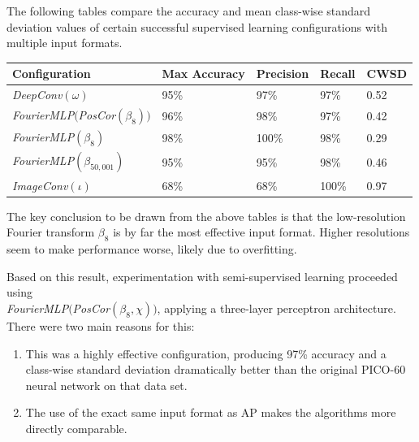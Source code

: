 \documentclass[10pt]{article}
\begin{document}
The following tables compare the accuracy and mean class-wise standard deviation values of certain successful supervised learning configurations with multiple input formats.

\begin{minipage}{\textwidth}
    \begin{center}
        \begin{tabular}{|l|l|l|l|l|}
            \hline
            Configuration & Max Accuracy & Precision & Recall & CWSD \\
            \hline
            {\it DeepConv}$(\omega)$ & 95\% & 97\% & 97\% & 0.52 \\
            \hline
            {\it FourierMLP}$(${\it PosCor}$(\beta_{8}))$ & 96\% & 98\% & 97\% & 0.42 \\
            \hline
            {\it FourierMLP}$(\beta_{8})$ & 98\% & 100\% & 98\% & 0.29 \\
            \hline
            {\it FourierMLP}$(\beta_{50,001})$ & 95\% & 95\% & 98\% & 0.46 \\
            \hline
            {\it ImageConv}$(\iota)$ & 68\% & 68\% & 100\% & 0.97 \\
            \hline
        \end{tabular}
    \end{center}
\end{minipage}

The key conclusion to be drawn from the above tables is that the low-resolution Fourier transform $\beta_{8}$ is by far the most effective input format. Higher resolutions seem to make performance worse, likely due to overfitting.

Based on this result, experimentation with semi-supervised learning proceeded using \\ {\it FourierMLP}$(${\it PosCor}$(\beta_{8}, \chi))$, applying a three-layer perceptron architecture. There were two main reasons for this:

\begin{enumerate}
    \item This was a highly effective configuration, producing 97\% accuracy and a class-wise standard deviation dramatically better than the original PICO-60 neural network on that data set.
    \item The use of the exact same input format as AP makes the algorithms more directly comparable.
\end{enumerate}
\end{document}
